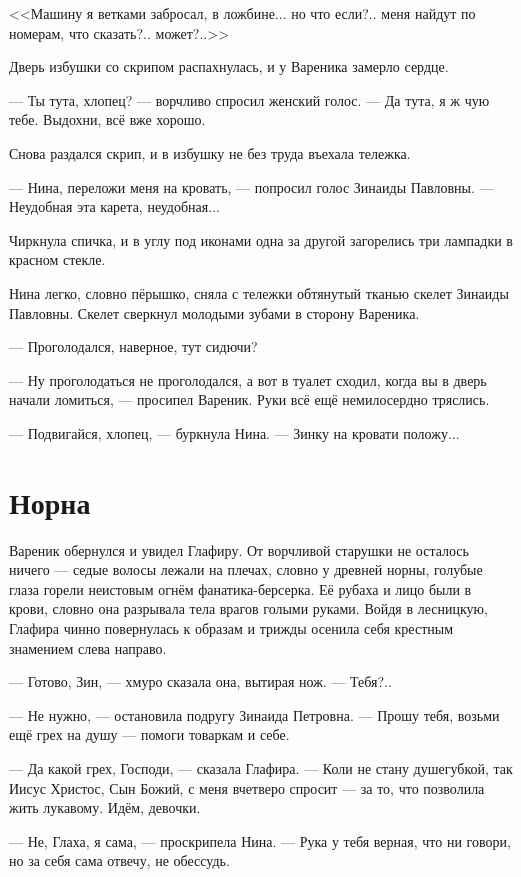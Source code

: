 \documentclass[a4paper,10pt,fleqn]{book}\usepackage{polyglossia}\setdefaultlanguage{english}\setotherlanguage{russian}\defaultfontfeatures{Ligatures=TeX,Mapping=tex-text} \usepackage{xcolor}\definecolor{lightgray}{HTML}{bbbbbb}\color{lightgray}\newcommand{\ml}[3]{\textcolor{black}{#3}}
\begin{document}
<<Машину я ветками забросал, в ложбине... но что если?.. меня найдут по номерам, что сказать?.. может?..>>

Дверь избушки со скрипом распахнулась, и у Вареника замерло сердце.

--- Ты тута, хлопец? --- ворчливо спросил женский голос.
--- Да тута, я ж чую тебе.
Выдохни, всё вже хорошо.

Снова раздался скрип, и в избушку не без труда въехала тележка.

--- Нина, переложи меня на кровать, --- попросил голос Зинаиды Павловны.
--- Неудобная эта карета, неудобная...

Чиркнула спичка, и в углу под иконами одна за другой загорелись три лампадки в красном стекле.

Нина легко, словно пёрышко, сняла с тележки обтянутый тканью скелет Зинаиды Павловны.
Скелет сверкнул молодыми зубами в сторону Вареника.

--- Проголодался, наверное, тут сидючи?

--- Ну проголодаться не проголодался, а вот в туалет сходил, когда вы в дверь начали ломиться, --- просипел Вареник.
Руки всё ещё немилосердно тряслись.

--- Подвигайся, хлопец, --- буркнула Нина.
--- Зинку на кровати положу...

\section{Норна}

Вареник обернулся и увидел Глафиру.
От ворчливой старушки не осталось ничего --- седые волосы лежали на плечах, словно у древней норны, голубые глаза горели неистовым огнём фанатика-берсерка.
Её рубаха и лицо были в крови, словно она разрывала тела врагов голыми руками.
Войдя в лесницкую, Глафира чинно повернулась к образам и трижды осенила себя крестным знамением слева направо.

--- Готово, Зин, --- хмуро сказала она, вытирая нож.
--- Тебя?..

--- Не нужно, --- остановила подругу Зинаида Петровна.
--- Прошу тебя, возьми ещё грех на душу --- помоги товаркам и себе.

--- Да какой грех, Господи, --- сказала Глафира.
--- Коли не стану душегубкой, так Иисус Христос, Сын Божий, с меня вчетверо спросит --- за то, что позволила жить лукавому.
Идём, девочки.

--- Не, Глаха, я сама, --- проскрипела Нина.
--- Рука у тебя верная, что ни говори, но за себя сама отвечу, не обессудь.
\end{document}
